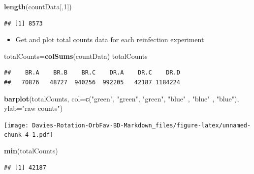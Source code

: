 \documentclass[
]{article}
\newenvironment{Shaded}{\begin{snugshade}}{\end{snugshade}}
\newcommand{\DataTypeTok}[1]{\textcolor[rgb]{0.13,0.29,0.53}{#1}}
\newcommand{\DecValTok}[1]{\textcolor[rgb]{0.00,0.00,0.81}{#1}}
\newcommand{\KeywordTok}[1]{\textcolor[rgb]{0.13,0.29,0.53}{\textbf{#1}}}
\newcommand{\NormalTok}[1]{#1}
\newcommand{\StringTok}[1]{\textcolor[rgb]{0.31,0.60,0.02}{#1}}
\providecommand{\tightlist}{%
  \setlength{\itemsep}{0pt}\setlength{\parskip}{0pt}}
\begin{document}
\begin{Shaded}
\begin{Highlighting}[]
\KeywordTok{length}\NormalTok{(countData[,}\DecValTok{1}\NormalTok{])}
\end{Highlighting}
\end{Shaded}

\begin{verbatim}
## [1] 8573
\end{verbatim}

\begin{itemize}
\tightlist
\item
  Get and plot total counts data for each reinfection experiment
\end{itemize}

\begin{Shaded}
\begin{Highlighting}[]
\NormalTok{totalCounts=}\KeywordTok{colSums}\NormalTok{(countData)}
\NormalTok{totalCounts}
\end{Highlighting}
\end{Shaded}

\begin{verbatim}
##    BR.A    BR.B    BR.C    DR.A    DR.C    DR.D 
##   70876   48727  940256  992205   42187 1184224
\end{verbatim}

\begin{Shaded}
\begin{Highlighting}[]
\KeywordTok{barplot}\NormalTok{(totalCounts, }\DataTypeTok{col=}\KeywordTok{c}\NormalTok{(}\StringTok{"green"}\NormalTok{,  }\StringTok{"green"}\NormalTok{, }\StringTok{"green"}\NormalTok{, }\StringTok{"blue"}\NormalTok{ , }\StringTok{"blue"}\NormalTok{ , }\StringTok{"blue"}\NormalTok{), }\DataTypeTok{ylab=}\StringTok{"raw counts"}\NormalTok{)}
\end{Highlighting}
\end{Shaded}

\texttt{[image: Davies-Rotation-OrbFav-BD-Markdown\_files/figure-latex/unnamed-chunk-4-1.pdf]}

\begin{Shaded}
\begin{Highlighting}[]
\KeywordTok{min}\NormalTok{(totalCounts)}
\end{Highlighting}
\end{Shaded}

\begin{verbatim}
## [1] 42187
\end{verbatim}
\end{document}
